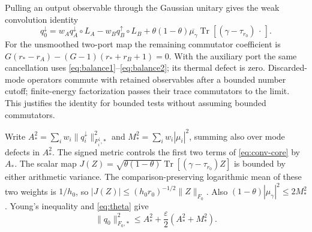 \documentclass[11pt]{article}
\newcommand{\Tr}{\operatorname{Tr}}
\theoremstyle{remark}\newtheorem{remark}[theorem]{Remark}
\begin{document}
Pulling an output observable through the Gaussian unitary gives the
weak convolution identity
\begin{equation}\label{eq:conv-core}
 q_0^\downarrow=w_A q_A^\downarrow\circ L_A
 -w_B q_B^\uparrow\circ L_B
 +\theta(1-\theta)\overline{\mu_\gamma}
       \Tr[(\gamma-\tau_{r_0})\,\cdot\,].
\end{equation}
For the unsmoothed two-port map the remaining commutator coefficient is
$G(r_*-r_A)-(G-1)(r_*+r_B+1)=0$.
With the auxiliary port the same cancellation uses
\eqref{eq:balance1}--\eqref{eq:balance2}; its thermal defect is zero.
Discarded-mode operators commute with retained observables after a bounded
number cutoff; finite-energy factorization passes their trace commutators
to the limit. This justifies the identity for bounded tests without
assuming bounded commutators.

Write $A_*^2=\sum_iw_i\|q_i^\downarrow\|_{F_i^\downarrow,*}^2$ and
$M_*^2=\sum_iw_i|\mu_i|^2$, summing also over mode defects in $A_*^2$.
The signed metric controls the first two terms of \eqref{eq:conv-core}
by $A_*$. The scalar map
$J(Z)=\sqrt{\theta(1-\theta)}\Tr[(\gamma-\tau_{r_0})Z]$
is bounded by either arithmetic variance. The comparison-preserving
logarithmic mean of these two weights is $1/h_0$, so
$|J(Z)|\le (h_0r_0)^{-1/2}\|Z\|_{F_0}$.
Also $(1-\theta)|\mu_\gamma|^2\le2M_*^2$.
Young's inequality and \eqref{eq:theta} give
\begin{equation}\label{eq:defect-bound-core}
 \|q_0\|_{F_0,*}^2\le A_*^2+\frac\varepsilon2(A_*^2+M_*^2).
\end{equation}
\end{document}
